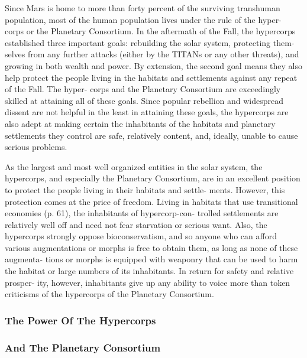 Since Mars is home to more than forty percent of 
the surviving transhuman population, most of the 
human population lives under the rule of the hyper-
corps or the Planetary Consortium. In the aftermath 
of the Fall, the hypercorps established three important 
goals: rebuilding the solar system, protecting them-
selves from any further attacks (either by the TITANs 
or any other threats), and growing in both wealth 
and power. By extension, the second goal means they 
also help protect the people living in the habitats and 
settlements against any repeat of the Fall. The hyper-
corps and the Planetary Consortium are exceedingly 
skilled at attaining all of these goals. Since popular 
rebellion and widespread dissent are not helpful in 
the least in attaining these goals, the hypercorps are 
also adept at making certain the inhabitants of the 
habitats and planetary settlements they control are 
safe, relatively content, and, ideally, unable to cause 
serious problems.

As the largest and most well organized entities in 
the solar system, the hypercorps, and especially the 
Planetary Consortium, are in an excellent position to 
protect the people living in their habitats and settle-
ments. However, this protection comes at the price 
of freedom. Living in habitats that use transitional 
economies (p. 61), the inhabitants of hypercorp-con-
trolled settlements are relatively well off and need not 
fear starvation or serious want. Also, the hypercorps 
strongly oppose bioconservatism, and so anyone who 
can afford various augmentations or morphs is free 
to obtain them, as long as none of these augmenta-
tions or morphs is equipped with weaponry that can 
be used to harm the habitat or large numbers of its 
inhabitants. In return for safety and relative prosper-
ity, however, inhabitants give up any ability to voice 
more than token criticisms of the hypercorps of the 
Planetary Consortium.

\subsubsection{The Power Of The Hypercorps}


\subsubsection{And The Planetary Consortium}

